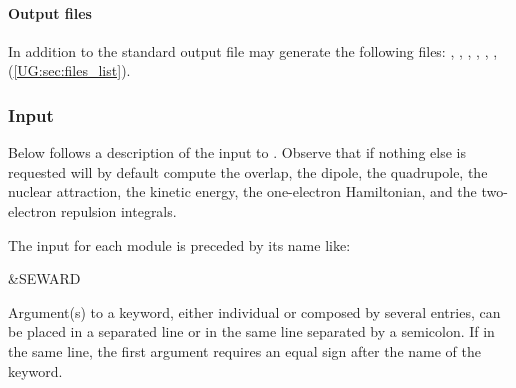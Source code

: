 \paragraph{Output files}

In addition to the standard output file
 may generate the following files:
, , , , ,
,  (\ref{UG:sec:files_list}).


\subsubsection{Input}
\label{UG:sec:seward_input}
Below follows a description of the input to .
Observe that if
nothing else is requested
 will by default compute the overlap, the
dipole, the quadrupole, the nuclear attraction, the kinetic energy,
the one-{}electron Hamiltonian, and the two-{}electron repulsion
integrals.

The input for each module is preceded by its name like:
\begin{inputlisting}
 &SEWARD
\end{inputlisting}

Argument(s) to a keyword, either individual or composed by several entries,
can be placed in a separated line or in the same line separated by a semicolon.
If in the same line, the first argument requires an equal sign after the
name of the keyword.

